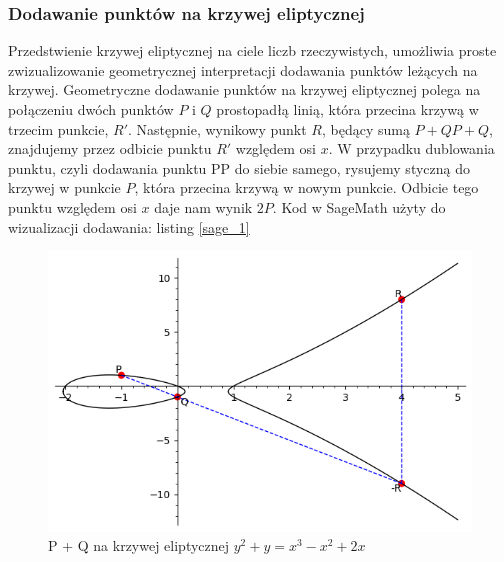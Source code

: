 \subsubsection{Dodawanie punktów na krzywej eliptycznej}
Przedstwienie krzywej eliptycznej na ciele liczb rzeczywistych,
umożliwia proste zwizualizowanie geometrycznej interpretacji dodawania punktów
leżących na krzywej.
\newline
\indent
Geometryczne dodawanie punktów na krzywej eliptycznej polega na połączeniu
dwóch punktów $P$ i $Q$ prostopadłą linią, która przecina krzywą w trzecim
punkcie, $R'$. Następnie, wynikowy punkt $R$, będący sumą $P+QP+Q$, znajdujemy przez
odbicie punktu $R'$ względem osi $x$. W przypadku dublowania punktu, czyli dodawania
punktu PP do siebie samego, rysujemy styczną do krzywej w punkcie $P$, która przecina
krzywą w nowym punkcie. Odbicie tego punktu względem osi $x$ daje nam wynik $2P$.
\newline
Kod w SageMath użyty do wizualizacji dodawania: listing \ref*{sage_1}
\begin{figure}[!h]
    \centering \includegraphics[width=0.8\linewidth]{sage/elliptic_rational_point_addition.png}
    \caption{P + Q na krzywej eliptycznej $y^2+y=x^3-x^2+2x$}
\end{figure}
\newpage
% 
